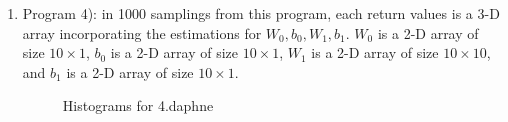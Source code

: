 \documentclass{article}
\begin{document}
\begin{enumerate}
\begin{enumerate}
\newpage
\item Program 4): in 1000 samplings from this program,  each return values is a 3-D array incorporating the estimations for $W_0, b_0, W_1, b_1$.  $W_0$ is a 2-D array of size $10\times 1$, $b_0$ is a 2-D array of size $10\times 1$, $W_1$ is a 2-D array of size $10\times 10$, and $b_1$ is a 2-D array of size $10\times 1$.
\begin{figure}[!htp]
	\centering
    \hfill%
	
	\centering
    \hfill%
        \caption{Histograms for 4.daphne}
\end{figure}
\end{enumerate}


\end{enumerate}
\end{document}
